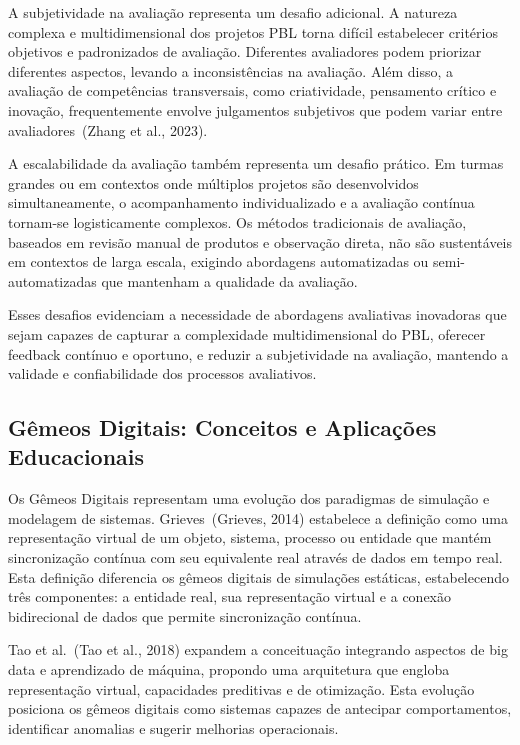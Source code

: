 \documentclass[english, spanish, brazilian]{modelo_dt}
\begin{document}
A subjetividade na avaliação representa um desafio adicional. A natureza complexa e multidimensional dos projetos PBL torna difícil estabelecer critérios objetivos e padronizados de avaliação. Diferentes avaliadores podem priorizar diferentes aspectos, levando a inconsistências na avaliação. Além disso, a avaliação de competências transversais, como criatividade, pensamento crítico e inovação, frequentemente envolve julgamentos subjetivos que podem variar entre avaliadores~(Zhang et al., 2023).

A escalabilidade da avaliação também representa um desafio prático. Em turmas grandes ou em contextos onde múltiplos projetos são desenvolvidos simultaneamente, o acompanhamento individualizado e a avaliação contínua tornam-se logisticamente complexos. Os métodos tradicionais de avaliação, baseados em revisão manual de produtos e observação direta, não são sustentáveis em contextos de larga escala, exigindo abordagens automatizadas ou semi-automatizadas que mantenham a qualidade da avaliação.

Esses desafios evidenciam a necessidade de abordagens avaliativas inovadoras que sejam capazes de capturar a complexidade multidimensional do PBL, oferecer feedback contínuo e oportuno, e reduzir a subjetividade na avaliação, mantendo a validade e confiabilidade dos processos avaliativos.

\subsection{Gêmeos Digitais: Conceitos e Aplicações Educacionais}

Os Gêmeos Digitais representam uma evolução dos paradigmas de simulação e modelagem de sistemas\@. Grieves\@~(Grieves, 2014) estabelece a definição como uma representação virtual de um objeto, sistema, processo ou entidade que mantém sincronização contínua com seu equivalente real através de dados em tempo real\@. Esta definição diferencia os gêmeos digitais de simulações estáticas, estabelecendo três componentes: a entidade real, sua representação virtual e a conexão bidirecional de dados que permite sincronização contínua\@.

Tao et al.\@~(Tao et al., 2018) expandem a conceituação integrando aspectos de big data e aprendizado de máquina, propondo uma arquitetura que engloba representação virtual, capacidades preditivas e de otimização\@. Esta evolução posiciona os gêmeos digitais como sistemas capazes de antecipar comportamentos, identificar anomalias e sugerir melhorias operacionais\@.
\end{document}
